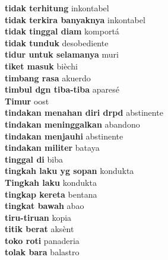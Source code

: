 \textbf{ tidak terhitung  } inkontabel \\
\textbf{ tidak terkira banyaknya  } inkontabel \\
\textbf{ tidak tinggal diam  } komportá \\
\textbf{ tidak tunduk  } desobediente \\
\textbf{ tidur untuk selamanya  } muri \\
\textbf{ tiket masuk  } bièchi \\
\textbf{ timbang rasa  } akuerdo \\
\textbf{ timbul dgn tiba-tiba  } aparesé \\
\textbf{ Timur  } oost \\
\textbf{ tindakan menahan diri drpd  } abstinente \\
\textbf{ tindakan meninggalkan  } abandono \\
\textbf{ tindakan menjauhi  } abstinente \\
\textbf{ tindakan militer  } bataya \\
\textbf{ tinggal di  } biba \\
\textbf{ tingkah laku yg sopan  } kondukta \\
\textbf{ Tingkah laku  } kondukta \\
\textbf{ tingkap kereta  } bentana \\
\textbf{ tingkat bawah  } abao \\
\textbf{ tiru-tiruan  } kopia \\
\textbf{ titik berat  } aksènt \\
\textbf{ toko roti  } panaderia \\
\textbf{ tolak bara  } balastro \\
